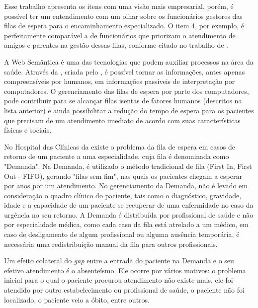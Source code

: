 Esse trabalho apresenta os itens com uma visão mais empresarial, porém, é possível ter um entendimento com um olhar sobre os funcionários gestores das filas de espera para o encaminhamento especializado. O item 4, por exemplo, é perfeitamente comparável a de funcionários que priorizam o atendimento de amigos e parentes na gestão dessas filas, conforme citado no trabalho de .

A Web Semântica é uma das tecnologias que podem auxiliar processos na área da saúde. Através da , criada pelo , é possível tornar as informações, antes apenas compreensíveis por humanos, em informações passíveis de interpretação por computadores. O gerenciamento das filas de espera por parte dos computadores, pode contribuir para se alcançar filas isentas de fatores humanos (descritos na lista anterior) e ainda possibilitar a redução do tempo de espera para os pacientes que precisam de um atendimento imediato de acordo com suas características físicas e sociais. 

No Hospital das Clínicas da  existe o problema da fila de espera em casos de retorno de um paciente a uma especialidade, cuja fila é denominada como "Demanda". Na Demanda, é utilizado o método tradicional de fila (First In, First Out - FIFO), gerando "filas sem fim", nas quais os pacientes chegam a esperar por anos por um atendimento. No gerenciamento da Demanda, não é levado em consideração o quadro clínico do paciente, tais como o diagnóstico, gravidade, idade e a capacidade de um paciente se recuperar de uma enfermidade no caso da urgência no seu retorno. A Demanda é distribuída por profissional de saúde e não por especialidade médica, como cada caso da fila está atrelado a um médico, em caso de desligamento de algum profissional ou alguma ausência temporária, é necessária uma redistribuição manual da fila para outros profissionais.

Um efeito colateral do \textit{gap} entre a entrada do paciente na Demanda e o seu efetivo atendimento é o absenteísmo. Ele ocorre por vários motivos: o problema inicial para o qual o paciente procurou atendimento não existe mais, ele foi atendido por outro estabelecimento ou profissional de saúde, o paciente não foi localizado, o paciente veio a óbito, entre outros. 

